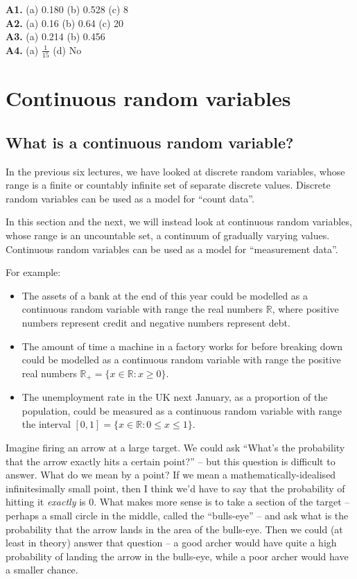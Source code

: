 \documentclass[
  a4paper,
]{book}
\theoremstyle{definition}
\theoremstyle{definition}
\theoremstyle{definition}
\theoremstyle{definition}
\theoremstyle{remark}
\begin{document}
\textbf{A1.} (a) 0.180 (b) 0.528 (c) 8\\
\textbf{A2.} (a) 0.16 (b) 0.64 (c) 20\\
\textbf{A3.} (a) 0.214 (b) 0.456\\
\textbf{A4.} (a) \(\frac{1}{15}\) (d) No

\hypertarget{L15-continuous}{%
\chapter{Continuous random variables}\label{L15-continuous}}

\hypertarget{continuous-rv}{%
\section{What is a continuous random variable?}\label{continuous-rv}}

In the previous six lectures, we have looked at discrete random variables, whose range is a finite or countably infinite set of separate discrete values. Discrete random variables can be used as a model for ``count data''.

In this section and the next, we will instead look at continuous random variables, whose range is an uncountable set, a continuum of gradually varying values. Continuous random variables can be used as a model for ``measurement data''.

For example:

\begin{itemize}
\item
  The assets of a bank at the end of this year could be modelled as a continuous random variable with range the real numbers \(\mathbb R\), where positive numbers represent credit and negative numbers represent debt.
\item
  The amount of time a machine in a factory works for before breaking down could be modelled as a continuous random variable with range the positive real numbers \(\mathbb R_+ = \{x \in \mathbb R : x \geq 0\}\).
\item
  The unemployment rate in the UK next January, as a proportion of the population, could be measured as a continuous random variable with range the interval \([0, 1] = \{x \in \mathbb R : 0 \leq x \leq 1\}\).
\end{itemize}

Imagine firing an arrow at a large target. We could ask ``What's the probability that the arrow exactly hits a certain point?'' -- but this question is difficult to answer. What do we mean by a point? If we mean a mathematically-idealised infinitesimally small point, then I think we'd have to say that the probability of hitting it \emph{exactly} is 0. What makes more sense is to take a section of the target -- perhaps a small circle in the middle, called the ``bulls-eye'' -- and ask what is the probability that the arrow lands in the area of the bulls-eye. Then we could (at least in theory) answer that question -- a good archer would have quite a high probability of landing the arrow in the bulls-eye, while a poor archer would have a smaller chance.
\end{document}
